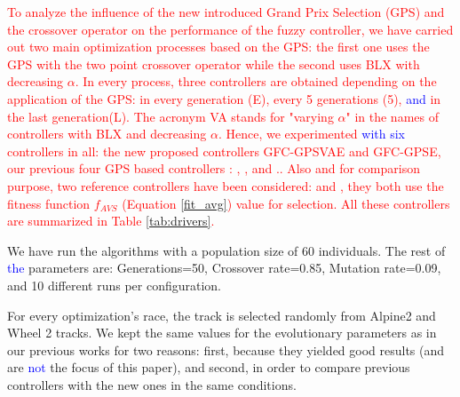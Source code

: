 \documentclass[10pt,journal,compsoc]{IEEEtran}
\begin{document}
\textcolor{red}{
To analyze the influence of the new introduced Grand Prix Selection
(GPS) and the crossover operator on the performance of the fuzzy
controller, we have carried out two main optimization processes based
on the GPS: the first one uses the GPS with the two point crossover
operator while the second uses  BLX with decreasing $\alpha$.
In every process, three controllers are obtained depending on the application of the GPS: in every generation (E), every 5 generations (5), \textcolor{blue}{and} in the last generation(L). The acronym VA  stands for "varying $\alpha$" in the names of  controllers with BLX and decreasing $\alpha$.
Hence, we experimented  \textcolor{blue}{ with six} controllers in all: the new
proposed controllers {\sf GFC-GPSVAE} and {\sf GFC-GPSE}, our previous four GPS based controllers \cite{DBLP:conf/cig/SalemMG19}: {}, {},{} and {}..
Also and for comparison purpose, two reference controllers have been considered: {}\cite{DBLP:conf/cig/SalemMG19} and {}\cite{salem_cig2018}, they both use the fitness function $f_{AVS}$ (Equation \ref{fit_avg}) value for selection.
All these controllers are summarized in Table \ref{tab:drivers}. 
}

We have run the algorithms with a population size of 60
individuals. The rest of  \textcolor{blue}{the} parameters are: Generations=50, Crossover
rate=0.85, Mutation rate=0.09, and 10 different runs per
configuration. %
              
For every optimization's race, the track is selected randomly from Alpine2 and Wheel 2 tracks.
We kept the same values for the evolutionary parameters as in our previous works for two reasons: first, because they yielded good results (and are  \textcolor{blue}{not} the focus of this paper), and second, in order to compare previous controllers with the new ones in the same conditions.
\end{document}
